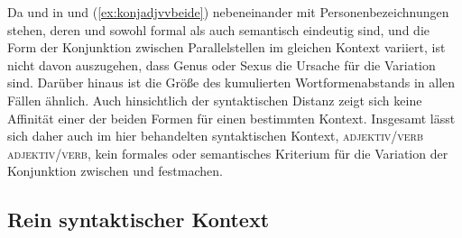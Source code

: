\begin{exe}
	
\end{exe}

Da  und  in  und
(\ref{ex:konjadjvvbeide}) nebeneinander mit Personenbezeichnungen stehen, deren
 und  sowohl formal als auch semantisch eindeutig sind,
und die Form der Konjunktion zwischen Parallelstellen im
gleichen Kontext variiert, ist nicht davon auszugehen, dass Genus oder
Sexus die Ursache für die Variation sind. Darüber hinaus ist die Größe des
kumulierten Wortformenabstands in allen Fällen ähnlich.
Auch hinsichtlich der syntaktischen Distanz zeigt sich
keine Affinität einer der beiden Formen für einen bestimmten Kontext. Insgesamt
lässt sich daher auch im hier behandelten syntaktischen Kontext,
 \textsc{adjektiv/verb} 
\textsc{adjektiv/verb}, kein formales oder semantisches Kriterium
für die Variation der Konjunktion zwischen  und 
festmachen.


\subsection{Rein syntaktischer Kontext}
\label{subsec:kcbeidquantsyncont}

